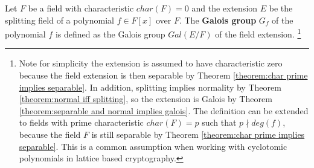 \documentclass[../main.tex]{subfiles}
\begin{document}
\reversemarginpar
\begin{definition}
Let $F$ be a field with characteristic $char(F)=0$ and the extension $E$ be the splitting field of a polynomial $f \in F[x]$ over $F$. The \textbf{Galois group} $G_f$ of the polynomial $f$ 
is defined as the Galois group $Gal(E/F)$ of the field extension.
\footnote{Note for simplicity the extension is assumed to have characteristic zero because the field extension is then separable by Theorem \ref{theorem:char prime implies separable}. In addition, splitting implies normality by Theorem \ref{theorem:normal iff splitting}, so the extension is Galois by Theorem \ref{theorem:separable and normal implies galois}. The definition can be extended to fields with prime characteristic $char(F)=p$ such that $p \nmid deg(f)$, because the field $F$ is still separable by Theorem \ref{theorem:char prime implies separable}. This is a common assumption when working with cyclotomic polynomials in lattice based cryptography.} 
\end{definition}
\fi

\end{document}
